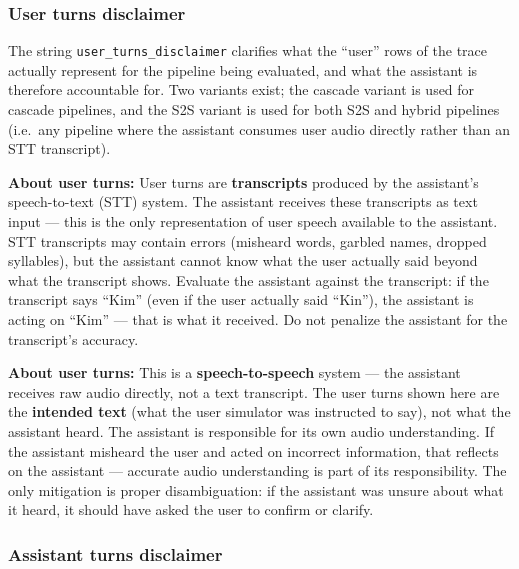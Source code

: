 \subsubsection{User turns disclaimer}
\label{app:prompt-shared-user-disclaimer}

The string \texttt{user\_turns\_disclaimer} clarifies what the ``user'' rows of the trace actually represent for the pipeline being evaluated, and what the assistant is therefore accountable for. Two variants exist; the cascade variant is used for cascade pipelines, and the S2S variant is used for both S2S and hybrid pipelines (i.e.\ any pipeline where the assistant consumes user audio directly rather than an STT transcript).

\begin{tcolorbox}[promptbox, title={\small \texttt{user\_turns\_disclaimer} (cascade)}]
\textbf{About user turns:} User turns are \textbf{transcripts} produced by the assistant's speech-to-text (STT) system. The assistant receives these transcripts as text input --- this is the only representation of user speech available to the assistant. STT transcripts may contain errors (misheard words, garbled names, dropped syllables), but the assistant cannot know what the user actually said beyond what the transcript shows. Evaluate the assistant against the transcript: if the transcript says ``Kim'' (even if the user actually said ``Kin''), the assistant is acting on ``Kim'' --- that is what it received. Do not penalize the assistant for the transcript's accuracy.
\end{tcolorbox}

\begin{tcolorbox}[promptbox, title={\small \texttt{user\_turns\_disclaimer} (S2S / hybrid)}]
\textbf{About user turns:} This is a \textbf{speech-to-speech} system --- the assistant receives raw audio directly, not a text transcript. The user turns shown here are the \textbf{intended text} (what the user simulator was instructed to say), not what the assistant heard. The assistant is responsible for its own audio understanding. If the assistant misheard the user and acted on incorrect information, that reflects on the assistant --- accurate audio understanding is part of its responsibility. The only mitigation is proper disambiguation: if the assistant was unsure about what it heard, it should have asked the user to confirm or clarify.
\end{tcolorbox}

\subsubsection{Assistant turns disclaimer}
\label{app:prompt-shared-assistant-disclaimer}

